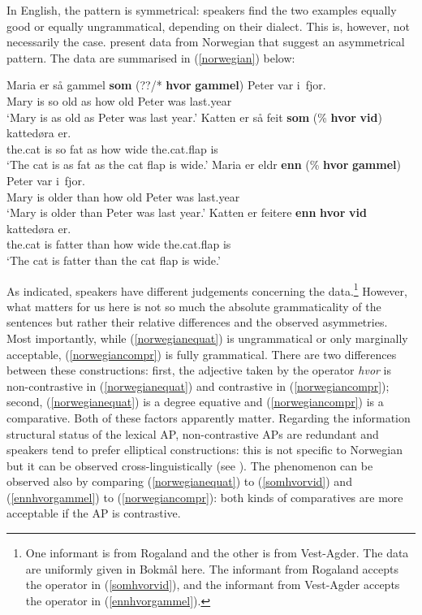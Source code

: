 \ea \label{englishsymmetrical}
\z
\z

In English, the pattern is symmetrical: speakers find the two examples equally good or equally ungrammatical, depending on their dialect. This is, however, not necessarily the case. \citet[199, 205--206, 209--210, 216]{bacskaiatkaribaudisch2018} present data from Norwegian that suggest an asymmetrical pattern. The data are summarised in (\ref{norwegian}) below:

\ea \label{norwegian}
\ea \gll Maria er så gammel \textbf{som} (??/* \textbf{hvor} \textbf{gammel}) Peter var i~fjor. \label{norwegianequat}\\
Mary is so old as {} how old Peter was last.year\\
\glt `Mary is as old as Peter was last year.'
\ex \gll Katten er så feit \textbf{som} (\% \textbf{hvor} \textbf{vid}) kattedøra er. \label{somhvorvid}\\
the.cat is so fat as {} how wide the.cat.flap is\\
\glt `The cat is as fat as the cat flap is wide.'
\ex \gll Maria er eldr \textbf{enn} (\% \textbf{hvor} \textbf{gammel}) Peter var i~fjor. \label{ennhvorgammel}\\
Mary is older than {} how old Peter was last.year\\
\glt `Mary is older than Peter was last year.'
\ex \gll Katten er feitere \textbf{enn} \textbf{hvor} \textbf{vid} kattedøra er. \label{norwegiancompr}\\
the.cat is fatter than how wide the.cat.flap is\\
\glt `The cat is fatter than the cat flap is wide.'
\z
\z

As indicated, speakers have different judgements concerning the data.\footnote{One informant is from Rogaland and the other is from Vest-Agder. The data are uniformly given in Bokmål here. The informant from Rogaland accepts the operator in (\ref{somhvorvid}), and the informant from Vest-Agder accepts the operator in (\ref{ennhvorgammel}).} However, what matters for us here is not so much the absolute grammaticality of the sentences but rather their relative differences and the observed asymmetries. Most importantly, while (\ref{norwegianequat}) is ungrammatical or only marginally acceptable, (\ref{norwegiancompr}) is fully grammatical. There are two differences between these constructions: first, the adjective taken by the operator \textit{hvor} is non-contrastive in (\ref{norwegianequat}) and contrastive in (\ref{norwegiancompr}); second, (\ref{norwegianequat}) is a degree equative and (\ref{norwegiancompr}) is a comparative. Both of these factors apparently matter. Regarding the information structural status of the lexical AP, non-contrastive APs are redundant and speakers tend to prefer elliptical constructions: this is not specific to Norwegian but it can be observed cross-linguistically (see \citealt{bacskaiatkari2018langsci}). The phenomenon can be observed also by comparing (\ref{norwegianequat}) to (\ref{somhvorvid}) and (\ref{ennhvorgammel}) to (\ref{norwegiancompr}): both kinds of comparatives are more acceptable if the AP is contrastive.\largerpage[2]

